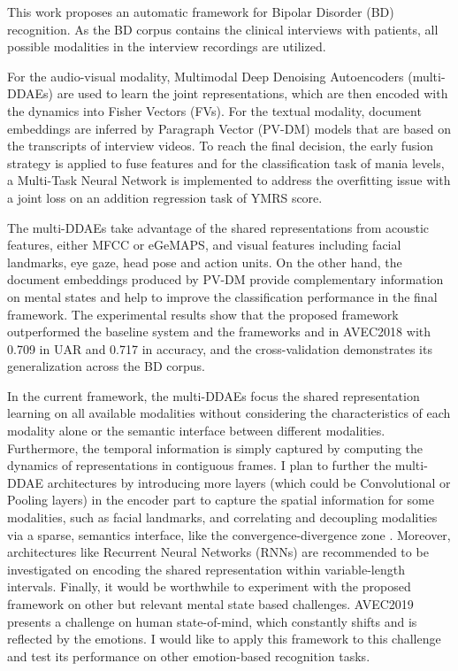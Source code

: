 
This work proposes an automatic framework for Bipolar Disorder (BD) recognition. As the BD corpus contains the clinical interviews with patients, all possible modalities in the interview recordings are utilized. 

For the audio-visual modality, Multimodal Deep Denoising Autoencoders (multi-DDAEs) are used to learn the joint representations, which are then encoded with the dynamics into Fisher Vectors (FVs). For the textual modality, document embeddings are inferred by Paragraph Vector (PV-DM) models that are based on the transcripts of interview videos. To reach the final decision, the early fusion strategy is applied to fuse features and for the classification task of mania levels, a Multi-Task Neural Network is implemented to address the overfitting issue with a joint loss on an addition regression task of YMRS score.

The multi-DDAEs take advantage of the shared representations from acoustic features, either MFCC or eGeMAPS, and visual features including facial landmarks, eye gaze, head pose and action units. On the other hand, the document embeddings produced by PV-DM provide complementary information on mental states and help to improve the classification performance in the final framework. The experimental results show that the proposed framework outperformed the baseline system and the frameworks \cite{du2018} and \cite{syed2018} in AVEC2018 with 0.709 in UAR and 0.717 in accuracy, and the cross-validation demonstrates its generalization across the BD corpus.

In the current framework, the multi-DDAEs focus the shared representation learning on all available modalities without considering the characteristics of each modality alone or the semantic interface between different modalities. Furthermore, the temporal information is simply captured by computing the dynamics of representations in contiguous frames. I plan to further the multi-DDAE architectures by introducing more layers (which could be Convolutional or Pooling layers) in the encoder part to capture the spatial information for some modalities, such as facial landmarks, and correlating and decoupling modalities via a sparse, semantics interface, like the convergence-divergence zone \cite{meyer2009}. Moreover, architectures like Recurrent Neural Networks (RNNs) are recommended to be investigated on encoding the shared representation within variable-length intervals. Finally, it would be worthwhile to experiment with the proposed framework on other but relevant mental state based challenges. AVEC2019 presents a challenge on human state-of-mind, which constantly shifts and is reflected by the emotions. I would like to apply this framework to this challenge and test its performance on other emotion-based recognition tasks.